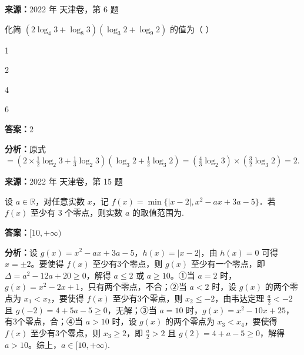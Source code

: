 \begin{question}[points=5]
\textbf{来源：}2022 年 天津卷，第 6 题\par
化简 $(2\log_4 3+\log_8 3)(\log_3 2+\log_9 2)$ 的值为（   ）
\begin{choices}
  \item 1
  \item 2
  \item 4
  \item 6
\end{choices}
\begin{solution}
\textbf{答案：}2

\textbf{分析：}原式 $=(2\times\frac{1}{2}\log_2 3+\frac{1}{3}\log_2 3)(\log_3 2+\frac{1}{2}\log_3 2)=(\frac{4}{3}\log_2 3)\times(\frac{3}{2}\log_3 2)=2$.
\end{solution}
\end{question}

\begin{question}[points=5]
\textbf{来源：}2022 年 天津卷，第 15 题\par
设 $a\in\mathbb{R}$，对任意实数 $x$，记 $f(x)=\min\{|x-2|, x^2-ax+3a-5\}$．若 $f(x)$ 至少有 3 个零点，则实数 $a$ 的取值范围为.
\fillin[{$[10,+\infty)$}]
\begin{solution}
\textbf{答案：}$[10,+\infty)$

\textbf{分析：}设 $g(x)=x^2-ax+3a-5$，$h(x)=|x-2|$，由 $h(x)=0$ 可得 $x=\pm2$。要使得 $f(x)$ 至少有3个零点，则 $g(x)$ 至少有一个零点，即 $\Delta=a^2-12a+20\ge0$，解得 $a\le2$ 或 $a\ge10$。①当 $a=2$ 时，$g(x)=x^2-2x+1$，只有两个零点，不合；②当 $a<2$ 时，设 $g(x)$ 的两个零点为 $x_1<x_2$，要使得 $f(x)$ 至少有3个零点，则 $x_2\le-2$，由韦达定理 $\frac{a}{2}<-2$ 且 $g(-2)=4+5a-5\ge0$，无解；③当 $a=10$ 时，$g(x)=x^2-10x+25$，有3个零点，合；④当 $a>10$ 时，设 $g(x)$ 的两个零点为 $x_3<x_4$，要使得 $f(x)$ 至少有3个零点，则 $x_3\ge2$，即 $\frac{a}{2}>2$ 且 $g(2)=4+a-5\ge0$，解得 $a>10$。综上，$a\in[10,+\infty)$.
\end{solution}
\end{question}

